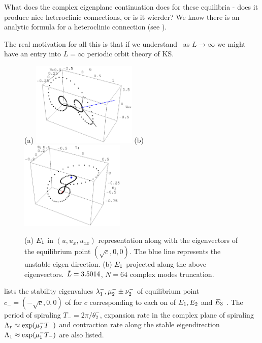 What does the complex eigenplane continuation does for these
equilibria - does it produce nice heteroclinic connections, or is it
wierder? We know there is an analytic formula for a heteroclinic
connection (see ). %

The real motivation for all this is that if we understand \eqva\ as
$L \to \infty$ we might have an entry into $L = \infty$ periodic orbit
theory of KS.

\begin{figure}[ht]
\centering
(a) \includegraphics[width=5.0cm]{figs/1wSteadyE.eps}
\hspace{0.1in}
(b) \includegraphics[width=5.0cm]{figs/1wSteadyP.eps}
\caption{
\small{
(a) $\EQV{1}$ in $(u,u_x,u_{xx})$ representation along with the eigenvectors of the equilibrium
point $(\sqrt{c},0,0)$. The blue line represents the unstable eigen-direction.
(b) $\EQV{1}$ projected along the above eigenvectors. $\tildeL=3.5014$, $N=64$ complex modes truncation.
}
}
\label{f:1wSteady}
\end{figure}

 lists the stability eigenvalues
$\eigExp[1]^-,\eigRe[2]^-\pm\eigIm[2]^-$
of equilibrium point $c_{-}=(-\sqrt{c},0,0)$
of  for $c$ corresponding to each on of $\EQV{1},\EQV{2}$ and $\EQV{3}$ \eqva.
The period of spiraling $T_{-}=2\pi/\theta^-_2$, expansion
rate in the complex plane of spiraling
$\ExpaEig_r\approx\exp(\eigRe[2]^- T_-)$ and contraction
rate along the stable eigendirection
$\ExpaEig_1\approx\exp(\eigRe[1]^- T_-)$ are also listed.

